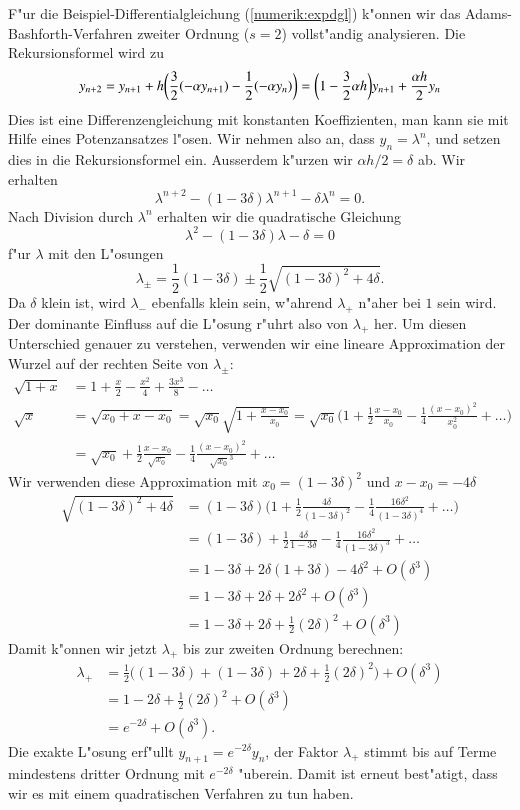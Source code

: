 F"ur die Beispiel-Differentialgleichung (\ref{numerik:expdgl}) k"onnen
wir das Adams-Bashforth-Verfahren zweiter Ordnung ($s=2$) vollst"andig
analysieren.
Die Rekursionsformel wird zu
\[
y_{n+2}=y_{n+1}+h\biggl(\frac32 (-\alpha y_{n+1})-\frac12(-\alpha y_n)\biggr)
=
\biggl(1-\frac32\alpha h\biggr)
y_{n+1}
+\frac{\alpha h}{2}
y_{n\mathstrut}
\]
Dies ist eine Differenzengleichung mit konstanten Koeffizienten, man kann
sie mit Hilfe eines Potenzansatzes l"osen. 
Wir nehmen also an, dass $y_n=\lambda^n$, und setzen dies in die
Rekursionsformel ein.
Ausserdem k"urzen wir $\alpha h/2=\delta$  ab.
Wir erhalten
\[
\lambda^{n+2}-(1-3\delta)\lambda^{n+1}-\delta\lambda^n=0.
\]
Nach Division durch $\lambda^n$ erhalten wir die quadratische Gleichung
\[
\lambda^2-(1-3\delta )\lambda-\delta=0
\]
f"ur $\lambda$ mit den L"osungen
\[
\lambda_\pm
=
\frac12(1-3\delta) \pm \frac12\sqrt{(1-3\delta)^2+4\delta}.
\]
Da $\delta$ klein ist, wird $\lambda_-$ ebenfalls klein sein,
w"ahrend $\lambda_+$ n"aher bei $1$ sein wird.
Der dominante Einfluss auf die L"osung r"uhrt also von $\lambda_+$ her.
Um diesen Unterschied genauer zu verstehen, verwenden wir eine
lineare Approximation der Wurzel auf der rechten Seite von $\lambda_\pm$:
\begin{align*}
\sqrt{1+x}
&=
1+\frac{x}{2}-\frac{x^2}{4}+\frac{3x^3}{8}-\dots
\\
\sqrt{x}
&=
\sqrt{x_0+x-x_0}
=
\sqrt{x_0}\sqrt{1+\frac{x-x_0}{x_0}}
=
\sqrt{x_0}\biggl(1+\frac12\frac{x-x_0}{x_0}-\frac14\frac{(x-x_0)^2}{x_0^2}+\dots\biggr)
\\
&=
\sqrt{x_0}+\frac12\frac{x-x_0}{\sqrt{x_0}}-\frac14\frac{(x-x_0)^2}{\sqrt{x_0}^3}+\dots
\end{align*}
Wir verwenden diese Approximation mit $x_0=(1-3\delta)^2$ und $x-x_0=-4\delta$
\begin{align*}
\sqrt{(1-3\delta)^2+4\delta}
&=
(1-3\delta)\biggl(1+\frac12\frac{4\delta}{(1-3\delta)^2}
-\frac14\frac{16\delta^2}{(1-3\delta)^4}+\dots\biggr)
\\
&=(1-3\delta)+\frac12\frac{4\delta}{1-3\delta}
-\frac14\frac{16\delta^2}{(1-3\delta)^3}+\dots
\\
&=1-3\delta+2\delta(1+3\delta)-4\delta^2+O(\delta^3)
\\
&=1-3\delta+2\delta + 2\delta^2+O(\delta^3)
\\
&=1-3\delta+2\delta + \frac12(2\delta)^2+O(\delta^3)
\end{align*}
Damit k"onnen wir jetzt $\lambda_+$ bis zur zweiten Ordnung berechnen:
\begin{align*}
\lambda_+
&=
\frac12\biggl((1-3\delta)+ (1-3\delta)+2\delta+\frac12(2\delta)^2\biggr)
+O(\delta^3)
\\
&=
1-2\delta+\frac12(2\delta)^2+O(\delta^3)
\\
&=e^{-2\delta}+O(\delta^3).
\end{align*}
Die exakte L"osung erf"ullt $y_{n+1}=e^{-2\delta}y_n$, der Faktor
$\lambda_+$ stimmt bis auf Terme mindestens dritter Ordnung mit 
$e^{-2\delta}$ "uberein.
Damit ist erneut best"atigt, dass wir es mit einem quadratischen Verfahren zu
tun haben.

